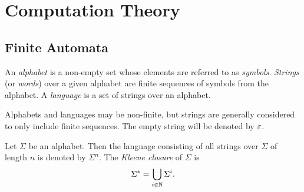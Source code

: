 
\chapter{Computation Theory}
\label{ch:computation}

\section{Finite Automata}

\begin{defn}
    An \emph{alphabet} is a non-empty set whose elements are referred to as \emph{symbols}. \emph{Strings} (or \emph{words}) over a given alphabet are finite sequences of symbols from the alphabet. A \emph{language} is a set of strings over an alphabet.
\end{defn}

\begin{rmk}
    Alphabets and languages may be non-finite, but strings are generally considered to only include finite sequences. The empty string will be denoted by $\varepsilon$.
\end{rmk}

\begin{defn}
    Let $\Sigma$ be an alphabet. Then the language consisting of all strings over $\Sigma$ of length $n$ is denoted by $\Sigma^{n}$. The \emph{Kleene closure} of $\Sigma$ is
    \begin{align*}
        \Sigma^{*} = \bigcup_{i\in\mathbb{N}}\Sigma^{i}.
    \end{align*}
\end{defn}

